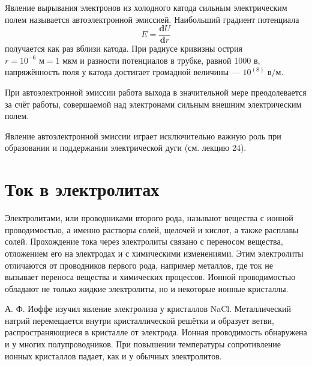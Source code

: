 \documentclass[a4paper,10pt]{book}
\begin{document}
Явление вырывания электронов из холодного катода сильным электрическим полем называется автоэлектронной эмиссией. Наибольший градиент потенциала\begin{equation}
E = \frac{\mathbf{d}U}{\mathbf{d}r}
\end{equation} получается как раз вблизи катода. При радиусе кривизны острия $r=10^{-6} \textit{ м} = 1 \textit{ мкм} $ и разности потенциалов в трубке, равной 1000 $\textit{в}$, напряжённость поля у катода достигает громадной величины — $10^(8)\textit{ в/м} $.

При автоэлектронной эмиссии работа выхода в значительной мере преодолевается за счёт работы, совершаемой над электронами сильным внешним электрическим полем.

Явление автоэлектронной эмиссии играет исключительно важную роль при образовании и поддержании электрической дуги (см. лекцию 24).

\chapter{Ток в электролитах}

Электролитами, или проводниками второго рода, называют вещества с ионной проводимостью, а именно растворы солей, щелочей и кислот, а также расплавы солей. Прохождение тока через электролиты связано с переносом вещества, отложением его на электродах и с химическими изменениями. Этим электролиты отличаются от проводников первого рода, например металлов, где ток не вызывает переноса вещества и химических процессов. Ионной проводимостью обладают не только жидкие электролиты, но и некоторые ионные кристаллы.

А. Ф. Иоффе изучил явление электролиза у кристаллов NaCl. Металлический натрий перемещается внутри кристаллической решётки и образует ветви, распространяющиеся в кристалле от электрода. Ионная проводимость обнаружена и у многих полупроводников. При повышении температуры сопротивление ионных кристаллов падает, как и у обычных электролитов.
\end{document}
